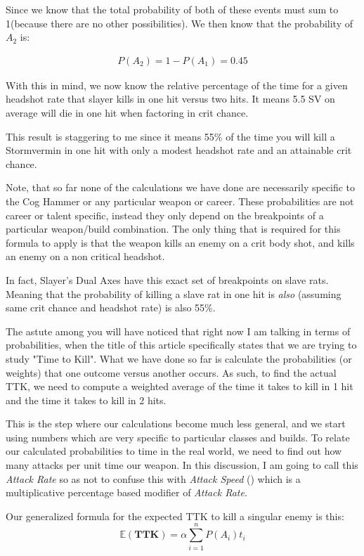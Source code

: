 \documentclass{article}
\begin{document}
Since we know that the total probability of both of these events must sum to 1(because there are no other possibilities). We then know that the probability of $A_2$ is:

\begin{align*}
P(A_2) = 1-P(A_1) = 0.45
\end{align*}

With this in mind, we now know the relative percentage of the time for a given headshot rate that  slayer kills in one hit versus two hits. It means 5.5 SV on average will die in one hit when factoring in crit chance.

This result is staggering to me since it means 55\% of the time you will kill a Stormvermin in one hit with only a modest headshot rate and an attainable crit chance.

Note, that so far none of the calculations we have done are necessarily specific to the Cog Hammer or any particular weapon or career. These probabilities are not career or talent specific, instead they only depend on the breakpoints of a particular weapon/build combination. The only thing that is required for this formula to apply is that the weapon kills an enemy on a crit body shot, and kills an enemy on a non critical headshot.

In fact, Slayer's Dual Axes have this exact set of breakpoints on slave rats. Meaning that the probability of killing a slave rat in one hit is \emph{also} (assuming same crit chance and headshot rate) is also 55\%.

The astute among you will have noticed that right now I am talking in terms of probabilities, when the title of this article specifically states that we are trying to study "Time to Kill". What we have done so far is calculate the probabilities (or weights) that one outcome versus another occurs. As such, to find the actual TTK, we need to compute a weighted average of the time it takes to kill in 1 hit and the time it takes to kill in 2 hits.

This is the step where our calculations become much less general, and we start using numbers which are very specific to particular classes and builds. To relate our calculated probabilities to time in the real world, we need to find out how many attacks per unit time our weapon. In this discussion, I am going to call this \emph{Attack Rate} so as not to confuse this with \emph{Attack Speed} () which is a multiplicative percentage based modifier of \emph{Attack Rate}.

Our generalized formula for the expected TTK to kill a singular enemy is this:
\begin{equation}
\mathbb{E}(\mathbf{TTK}) = \alpha \sum_{i=1}^{n} P(A_i) t_i
\end{equation}
\end{document}

